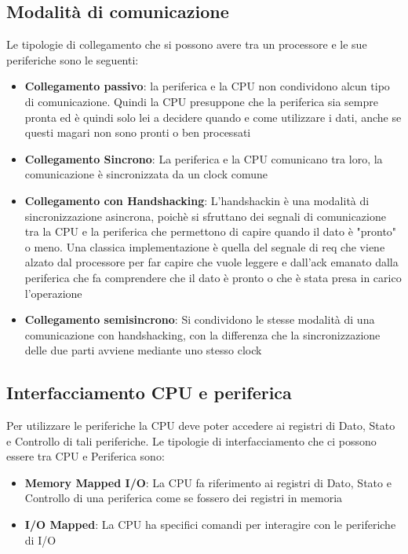\subsection{Modalità di comunicazione}
Le tipologie di collegamento che si possono avere tra un processore e le sue periferiche sono le seguenti:
\begin{itemize}
    \item \textbf{Collegamento passivo}: la periferica e la CPU non condividono alcun tipo di comunicazione. Quindi la CPU presuppone che la periferica sia sempre pronta ed è quindi solo lei a decidere quando e come utilizzare i dati, anche se questi magari non sono pronti o ben processati
    \item \textbf{Collegamento Sincrono}: La periferica e la CPU comunicano tra loro, la comunicazione è sincronizzata da un clock comune
    \item \textbf{Collegamento con Handshacking}: L'handshackin è una modalità di sincronizzazione asincrona, poichè si sfruttano dei segnali di comunicazione tra la CPU e la periferica che permettono di capire quando il dato è "pronto" o meno. Una classica implementazione è quella del segnale di req che viene alzato dal processore per far capire che vuole leggere e dall'ack emanato dalla periferica che fa comprendere che il dato è pronto o che è stata presa in carico l'operazione
    \item \textbf{Collegamento semisincrono}: Si condividono le stesse modalità di una comunicazione con handshacking, con la differenza che la sincronizzazione delle due parti avviene mediante uno stesso clock
\end{itemize}

\subsection{Interfacciamento CPU e periferica}
Per utilizzare le periferiche la CPU deve poter accedere ai registri di Dato, Stato e Controllo di tali periferiche. Le tipologie di interfacciamento che ci possono essere tra CPU e Periferica sono:
\begin{itemize}
    \item \textbf{Memory Mapped I/O}: La CPU fa riferimento ai registri di Dato, Stato e Controllo di una periferica come se fossero dei registri in memoria
    \item \textbf{I/O Mapped}: La CPU ha specifici comandi per interagire con le periferiche di I/O
\end{itemize}

